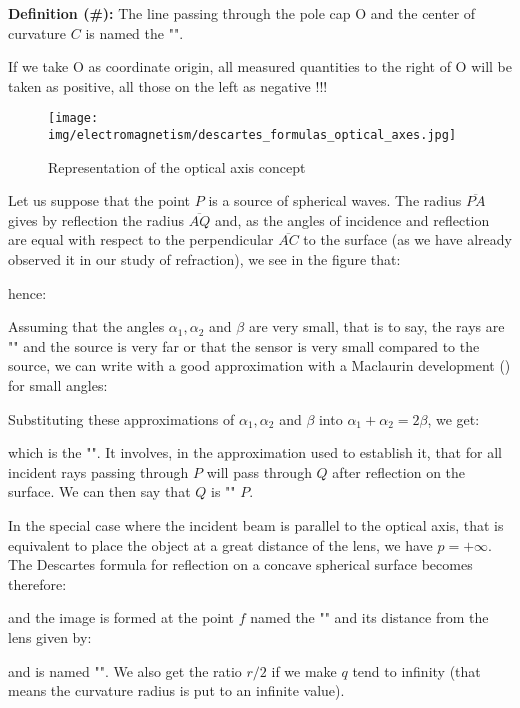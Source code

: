 	\textbf{Definition (\#\mydef):} The line passing through the pole cap O and the center of curvature $C$ is named the "".
	
	If we take O as coordinate origin, all measured quantities to the right of O will be taken as positive, all those on the left as negative !!!
	
	\begin{figure}[H]
		\centering
		\texttt{[image: img/electromagnetism/descartes\_formulas\_optical\_axes.jpg]}
		\caption{Representation of the optical axis concept}
	\end{figure}
	Let us suppose that the point $P$ is a source of spherical waves. The radius $\overline{PA}$ gives by reflection the radius $\overline{AQ}$ and, as the angles of incidence and reflection are equal with respect to the perpendicular $\overline{AC}$ to the surface (as we have already observed it in our study of refraction), we see in the figure that:
	
	hence:
	
	Assuming that the angles $\alpha_1,\alpha_2$ and $\beta$ are very small, that is to say, the rays are "" and the source is very far or that the sensor is very small compared to the source, we can write with a good approximation with a Maclaurin  development () for small angles:
	
	Substituting these approximations of $\alpha_1,\alpha_2$ and $\beta$ into $\alpha_1+\alpha_2=2\beta$, we get:
	
	which is the "". It involves, in the approximation used to establish it, that for all incident rays passing through $P$ will pass through $Q$ after reflection on the surface. We can then say that $Q$ is "" $P$.
	
	In the special case where the incident beam is parallel to the optical axis, that is equivalent to place the object at a great distance of the lens, we have $p=+\infty$. The Descartes formula for reflection on a concave spherical surface becomes therefore:
	
	and the image is formed at the point $f$ named the  "" and its distance from the lens given by:
	
	and is named "". We also get the ratio $r/2$ if we make $q$ tend to infinity (that means the curvature radius is put to an infinite value).
	
